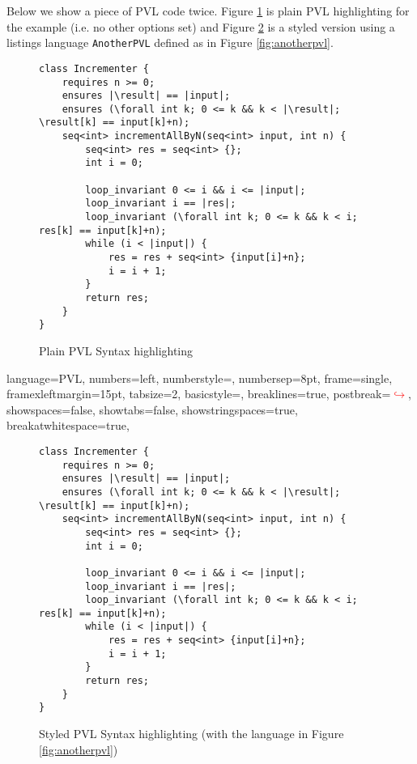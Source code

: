 \documentclass[a4paper]{scrartcl}
\begin{document}
Below we show a piece of PVL code twice. Figure \ref{fig:plain_pvl} is plain PVL highlighting for the example (i.e. no other options set) and Figure \ref{fig:styled_pvl} is a styled version using a listings language \texttt{AnotherPVL} defined as in Figure \ref{fig:anotherpvl}.

\begin{figure}
\begin{lstlisting}[language=PVL]
class Incrementer {
	requires n >= 0;
	ensures |\result| == |input|;
	ensures (\forall int k; 0 <= k && k < |\result|; \result[k] == input[k]+n);
	seq<int> incrementAllByN(seq<int> input, int n) {
		seq<int> res = seq<int> {};
		int i = 0;
		
		loop_invariant 0 <= i && i <= |input|;
		loop_invariant i == |res|;
		loop_invariant (\forall int k; 0 <= k && k < i; res[k] == input[k]+n);
		while (i < |input|) {
			res = res + seq<int> {input[i]+n};
			i = i + 1;
		}
		return res;
	}
}
\end{lstlisting}
\caption{Plain PVL Syntax highlighting}
\label{fig:plain_pvl}
\end{figure}

 {
	language=PVL,
	numbers=left, 
	numberstyle=\small, 
	numbersep=8pt, 
	frame=single, 
	framexleftmargin=15pt,
	tabsize=2,
	basicstyle=\footnotesize\ttfamily,
	breaklines=true,
	postbreak=\mbox{\textcolor{red}{$\hookrightarrow$}\space},
	showspaces=false,
	showtabs=false,
	showstringspaces=true,
	breakatwhitespace=true,
}


\begin{figure}
	\begin{lstlisting}[language=AnotherPVL]
class Incrementer {
    requires n >= 0;
    ensures |\result| == |input|;
    ensures (\forall int k; 0 <= k && k < |\result|; \result[k] == input[k]+n);
    seq<int> incrementAllByN(seq<int> input, int n) {
        seq<int> res = seq<int> {};
        int i = 0;
        
        loop_invariant 0 <= i && i <= |input|;
        loop_invariant i == |res|;
        loop_invariant (\forall int k; 0 <= k && k < i; res[k] == input[k]+n);
        while (i < |input|) {
            res = res + seq<int> {input[i]+n};
            i = i + 1;
        }
        return res;
    }
}
\end{lstlisting}
\caption{Styled PVL Syntax highlighting (with the language in Figure \ref{fig:anotherpvl})}
\label{fig:styled_pvl}
\end{figure}
\end{document}

